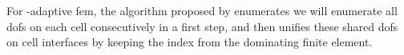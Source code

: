 






For \hp-adaptive \gls{fem}, the algorithm proposed by \textcite[Sec.~4.2]{bangerth2009} enumerates we will enumerate all \glspl{dof} on each cell consecutively in a first step, and then unifies these shared \glspl{dof} on cell interfaces by keeping the index from the dominating finite element.



